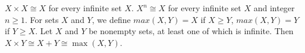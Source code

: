  $X \times X \cong X$ for every infinite set $X$.
 $X^n \cong X$ for every infinite set $X$ and integer $n \geq 1$.
 For sets $X$ and $Y$, we define $max(X, Y) = X$ if $X \geq Y$, $max(X, Y) = Y$ if $Y \geq X$.
 Let $X$ and $Y$ be nonempty sets, at least one of which is infinite. Then $X \times Y \cong X + Y \cong \max(X, Y)$.
